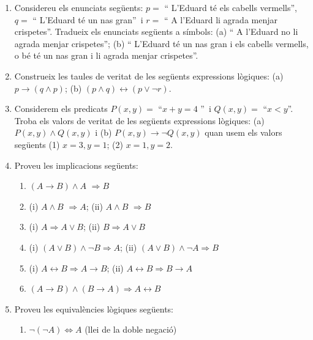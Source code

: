 \begin{enumerate}
\item Considereu els enunciats següents: $p=$ \enquote{ L'Eduard
té els cabells vermells}, $q=$ \enquote{ L'Eduard
té un nas gran}\ i $r=$ \enquote{ A l'Eduard li
agrada menjar crispetes}. Tradueix els enunciats següents
a símbols: (a) \enquote{ A l'Eduard no li agrada menjar
crispetes}; (b) \enquote{ L'Eduard té un nas gran
i els cabells vermells, o bé té un nas gran i li agrada menjar
crispetes}.

\item Construeix les taules de veritat de les següents expressions
lògiques: (a) $p\longrightarrow(q\wedge p)$; (b) $(p\wedge
q)\longleftrightarrow(p\vee\lnot r)$.

\item Considerem els predicats $P(x,y)=$ \enquote{$x+y=4$%
}\ i $Q(x,y)=$ \enquote{$x<y$}.
Troba els valors de veritat de les següents expressions lògiques: (a)
$P(x,y)\wedge Q(x,y)$ i (b) $P(x,y)\longrightarrow\lnot Q(x,y)$ quan usem els
valors següents (1) $x=3,y=1$; (2) $x=1,y=2$.

\item Proveu les implicacions següents:

\begin{enumerate}
\item $(A\longrightarrow B)\wedge A$ $\Longrightarrow B$

\item (i) $A\wedge B$ $\Longrightarrow A$; (ii) $A\wedge B$ $\Longrightarrow
B$

\item (i) $A\Longrightarrow A\vee B$; (ii) $B\Longrightarrow A\vee B$

\item (i) $\left(  A\vee B\right)  \wedge\lnot B\Longrightarrow A$; (ii)
$\left(  A\vee B\right)  \wedge\lnot A\Longrightarrow B$

\item (i) $A\longleftrightarrow B\Longrightarrow A\longrightarrow B$; (ii)
$A\longleftrightarrow B\Longrightarrow B\longrightarrow A$

\item $\left(  A\longrightarrow B\right)  \wedge\left(  B\longrightarrow
A\right)  \Longrightarrow A\longleftrightarrow B$
\end{enumerate}

\item Proveu les equivalències lògiques següents:

\begin{enumerate}
\item $\lnot\left(  \lnot A\right)  \Longleftrightarrow A$ (llei de la doble negació)


\end{enumerate}
\end{enumerate}
